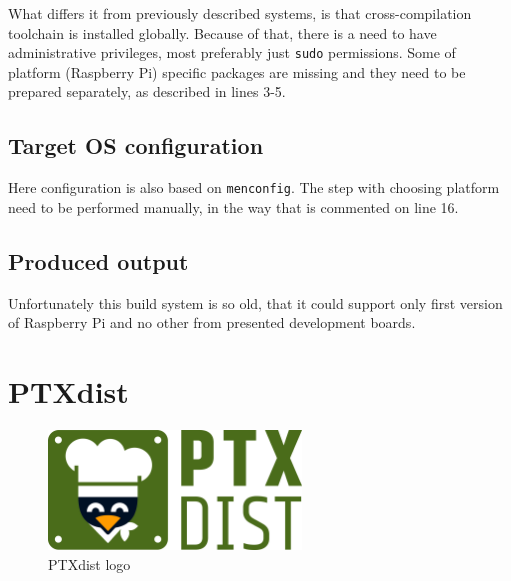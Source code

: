 \documentclass[printmode]{mgr}
\begin{document}
What differs it from previously described systems, is that cross-compilation toolchain is installed globally.
Because of that, there is a need to have administrative privileges, most preferably just \verb|sudo| permissions.
Some of platform (Raspberry Pi) specific packages are missing and they need to be prepared separately, as described in lines 3-5.

\subsection*{Target OS configuration}

Here configuration is also based on \verb|menconfig|.
The step with choosing platform need to be performed manually, in the way that is commented on line 16.

\subsection*{Produced output}

Unfortunately this build system is so old, that it could support only first version of Raspberry Pi and no other from presented development boards.





\section{PTXdist}





\begin{figure}[htbp]
  \centering
    \includegraphics[width=0.6\textwidth]{ptxdist-logo.png}
    \caption{PTXdist logo}
  \label{fig:ptxdist-logo}
\end{figure}
\end{document}

